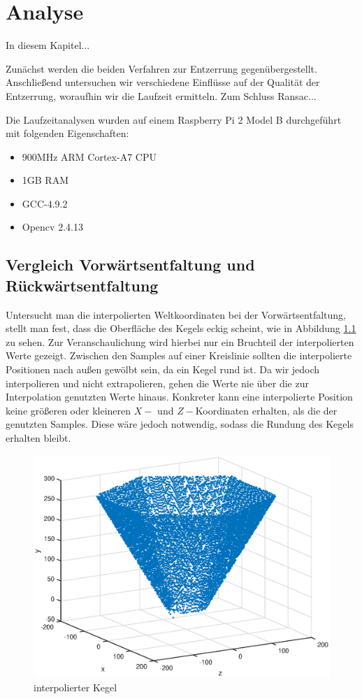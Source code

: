 \chapter{Analyse}
\label{ch:analysis}
In diesem Kapitel...

Zunächst werden die beiden Verfahren zur Entzerrung gegenübergestellt. Anschließend untersuchen wir verschiedene Einflüsse auf der Qualität der Entzerrung, woraufhin wir die Laufzeit ermitteln. 
Zum Schluss Ransac...

Die Laufzeitanalysen wurden auf einem Raspberry Pi 2 Model B durchgeführt mit folgenden Eigenschaften:
\begin{itemize}
	\item 900MHz ARM Cortex-A7 CPU
	\item 1GB RAM
	\item GCC-4.9.2
	\item Opencv 2.4.13
\end{itemize}


\section{Vergleich Vorwärtsentfaltung und Rückwärtsentfaltung}
Untersucht man die interpolierten Weltkoordinaten bei der Vorwärtsentfaltung, stellt man fest, dass die Oberfläche des Kegels eckig scheint, wie in Abbildung \ref{fig:3DInterpol} zu sehen. Zur Veranschaulichung wird hierbei nur ein Bruchteil der interpolierten Werte gezeigt. Zwischen den Samples auf einer Kreislinie sollten die interpolierte Positionen nach außen gewölbt sein, da ein Kegel rund ist. Da wir jedoch interpolieren und nicht extrapolieren, gehen die Werte nie über die zur Interpolation genutzten Werte hinaus. Konkreter kann eine interpolierte Position keine größeren oder kleineren $X-$ und $Z-$Koordinaten erhalten, als die der genutzten Samples. Diese wäre jedoch notwendig, sodass die Rundung des Kegels erhalten bleibt.

\begin{figure}[!htb]
	\centering
	\includegraphics[scale=.7]{images/3d_interpol.eps}
	\caption{interpolierter Kegel}
	\label{fig:3DInterpol}
\end{figure}

